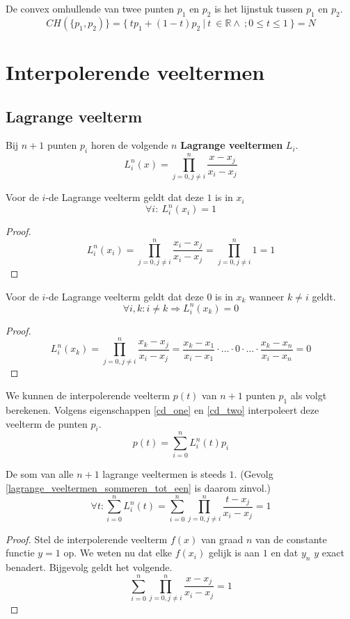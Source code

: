 \documentclass[computergesteund_ontwerp_van_curven_en_oppervlakken.tex]{subfiles}
\begin{document}
\begin{gev}
De convex omhullende van twee punten $p_1$ en $p_2$ is het lijnstuk tussen $p_1$ en $p_2$.
\[
CH(\{p_1, p_2)\} = \{\ tp_1 + (1-t)p_2\ |\ t\ \in \mathbb{R}\wedge\ ;0\le t\le 1\ \} = N
\]
\end{gev}



\section{Interpolerende veeltermen}
\subsection{Lagrange veelterm}
\begin{de}
Bij $n+1$ punten $p_i$ horen de volgende $n$ \textbf{Lagrange veeltermen} $L_i$.
\[
L_{i}^{n}(x) = \prod_{j=0, j \neq i}^{n} \frac{x-x_{j}}{x_{i}-x_{j}}
\]
\end{de}

\begin{ei}
\label{cd_one}
Voor de $i$-de Lagrange veelterm geldt dat deze $1$ is in $x_i$
\[
\forall i:\ L_{i}^{n}(x_i) = 1
\]
\begin{proof}

\[
L_{i}^{n}(x_i)
= \prod_{j=0, j \neq i}^{n} \frac{x_i-x_{j}}{x_{i}-x_{j}}
= \prod_{j=0, j \neq i}^{n} 1
= 1
\]
\end{proof}
\end{ei}

\begin{ei}
\label{cd_two}
Voor de $i$-de Lagrange veelterm geldt dat deze $0$ is in $x_k$ wanneer $k\neq i$ geldt.
\[
\forall i,k:i\neq k \Rightarrow L_i^{n}(x_k) = 0
\]
\begin{proof}
\[
L_{i}^{n}(x_k)
= \prod_{j=0, j \neq i}^{n} \frac{x_k-x_{j}}{x_{i}-x_{j}}
= \frac{x_k-x_{1}}{x_{i}-x_{1}}\cdot \ldots \cdot 0 \cdot \ldots \cdot \frac{x_k-x_{n}}{x_{i}-x_{n}}
= 0
\]
\end{proof}
\end{ei}

\begin{gev}
\label{lagrange_veeltermen_sommeren_tot_een}
We kunnen de interpolerende veelterm $p(t)$ van $n+1$ punten $p_1$ als volgt berekenen. Volgens eigenschappen \ref{cd_one} en \ref{cd_two} interpoleert deze veelterm de punten $p_i$.
\[
p(t) = \sum_{i=0}^{n}L_{i}^{n}(t)p_i
\]
\end{gev}

\begin{ei}
De som van alle $n+1$ lagrange veeltermen is steeds $1$. (Gevolg \ref{lagrange_veeltermen_sommeren_tot_een} is daarom zinvol.)
\[
\forall t: \sum_{i=0}^{n}L_i^{n}(t) = \sum_{i=0}^{n}\prod_{j=0, j \neq i}^{n} \frac{t-x_{j}}{x_{i}-x_{j}} = 1
\]
\begin{proof}
Stel de interpolerende veelterm $f(x)$ van graad $n$ van de constante functie $y=1$ op.
We weten nu dat elke $f(x_i)$ gelijk is aan $1$ en dat $y_n$ $y$ exact benadert.
Bijgevolg geldt het volgende.
\[
\sum_{i=0}^{n}\prod_{j=0,j\neq i}^{n}\frac{x-x_j}{x_i-x_j} = 1
\]
\end{proof}
\end{ei}
\end{document}
